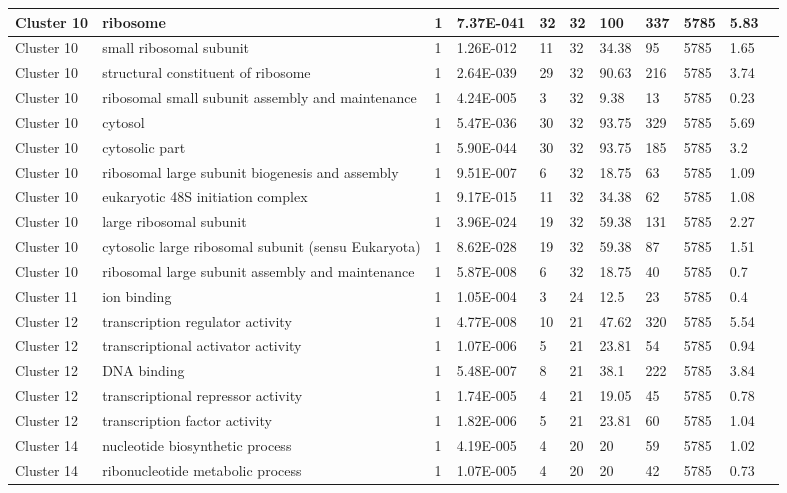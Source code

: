 \begin{tabular}{|l|l|l|l|l|l|l|l|l|l|l|}
\hline
Cluster 10&ribosome&1&7.37E-041&32&32&100&337&5785&5.83&\\
\hline
Cluster 10&small ribosomal subunit&1&1.26E-012&11&32&34.38&95&5785&1.65&\\
\hline
Cluster 10&structural constituent of ribosome&1&2.64E-039&29&32&90.63&216&5785&3.74&\\
\hline
Cluster 10&ribosomal small subunit assembly and maintenance&1&4.24E-005&3&32&9.38&13&5785&0.23&\\
\hline
Cluster 10&cytosol&1&5.47E-036&30&32&93.75&329&5785&5.69&\\
\hline
Cluster 10&cytosolic part&1&5.90E-044&30&32&93.75&185&5785&3.2&\\
\hline
Cluster 10&ribosomal large subunit biogenesis and assembly&1&9.51E-007&6&32&18.75&63&5785&1.09&\\
\hline
Cluster 10&eukaryotic 48S initiation complex&1&9.17E-015&11&32&34.38&62&5785&1.08&\\
\hline
Cluster 10&large ribosomal subunit&1&3.96E-024&19&32&59.38&131&5785&2.27&\\
\hline
Cluster 10&cytosolic large ribosomal subunit (sensu Eukaryota)&1&8.62E-028&19&32&59.38&87&5785&1.51&\\
\hline
Cluster 10&ribosomal large subunit assembly and maintenance&1&5.87E-008&6&32&18.75&40&5785&0.7&\\
\hline
Cluster 11&ion binding&1&1.05E-004&3&24&12.5&23&5785&0.4&\\
\hline
Cluster 12&transcription regulator activity&1&4.77E-008&10&21&47.62&320&5785&5.54&\\
\hline
Cluster 12&transcriptional activator activity&1&1.07E-006&5&21&23.81&54&5785&0.94&\\
\hline
Cluster 12&DNA binding&1&5.48E-007&8&21&38.1&222&5785&3.84&\\
\hline
Cluster 12&transcriptional repressor activity&1&1.74E-005&4&21&19.05&45&5785&0.78&\\
\hline
Cluster 12&transcription factor activity&1&1.82E-006&5&21&23.81&60&5785&1.04&\\
\hline
Cluster 14&nucleotide biosynthetic process&1&4.19E-005&4&20&20&59&5785&1.02&\\
\hline
Cluster 14&ribonucleotide metabolic process&1&1.07E-005&4&20&20&42&5785&0.73&\\
\hline
\end{tabular}
